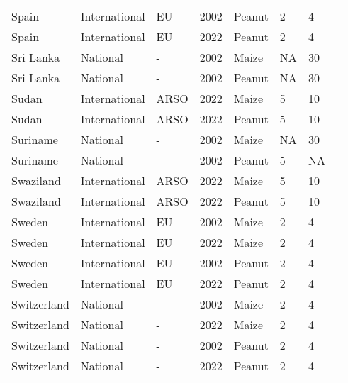 \begin{landscape}
\begin{longtable}[c]{llllllll}
Spain             & International & EU       & 2002 & Peanut & 2  & 4  & \citet{EC2010}               \\
Spain             & International & EU       & 2022 & Peanut & 2  & 4  & \citet{EC2010}               \\
Sri Lanka         & National      & -        & 2002 & Maize  & NA & 30 & \citet{van2004worldwide}     \\
Sri Lanka         & National      & -        & 2002 & Peanut & NA & 30 & \citet{van2004worldwide}     \\
Sudan             & International & ARSO     & 2022 & Maize  & 5  & 10 & \citet{ARSO2022}             \\
Sudan             & International & ARSO     & 2022 & Peanut & 5  & 10 & \citet{ARSO2022}             \\
Suriname          & National      & -        & 2002 & Maize  & NA & 30 & \citet{van2004worldwide}     \\
Suriname          & National      & -        & 2002 & Peanut & 5  & NA & \citet{van2004worldwide}     \\
Swaziland         & International & ARSO     & 2022 & Maize  & 5  & 10 & \citet{ARSO2022}             \\
Swaziland         & International & ARSO     & 2022 & Peanut & 5  & 10 & \citet{ARSO2022}             \\
Sweden            & International & EU       & 2002 & Maize  & 2  & 4  & \citet{EC2010}               \\
Sweden            & International & EU       & 2022 & Maize  & 2  & 4  & \citet{EC2010}               \\
Sweden            & International & EU       & 2002 & Peanut & 2  & 4  & \citet{EC2010}               \\
Sweden            & International & EU       & 2022 & Peanut & 2  & 4  & \citet{EC2010}               \\
Switzerland       & National      & -        & 2002 & Maize  & 2  & 4  & \citet{van2004worldwide}     \\
Switzerland       & National      & -        & 2022 & Maize  & 2  & 4  & \citet{FDHA2016}             \\
Switzerland       & National      & -        & 2002 & Peanut & 2  & 4  & \citet{van2004worldwide}     \\
Switzerland       & National      & -        & 2022 & Peanut & 2  & 4  & \citet{FDHA2016}             \\

\end{longtable}
\end{landscape}
